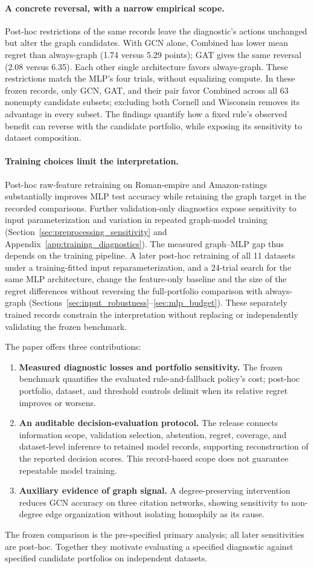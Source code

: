 \paragraph{A concrete reversal, with a narrow empirical scope.}
Post-hoc restrictions of the same records leave the diagnostic's actions unchanged but alter the graph candidates. With GCN alone, Combined has lower mean regret than always-graph (1.74 versus 5.29 points); GAT gives the same reversal (2.08 versus 6.35). Each other single architecture favors always-graph. These restrictions match the MLP's four trials, without equalizing compute. In these frozen records, only GCN, GAT, and their pair favor Combined across all 63 nonempty candidate subsets; excluding both Cornell and Wisconsin removes its advantage in every subset. The findings quantify how a fixed rule's observed benefit can reverse with the candidate portfolio, while exposing its sensitivity to dataset composition.

\paragraph{Training choices limit the interpretation.}
Post-hoc raw-feature retraining on Roman-empire and Amazon-ratings substantially improves MLP test accuracy while retaining the graph target in the recorded comparisons. Further validation-only diagnostics expose sensitivity to input parameterization and variation in repeated graph-model training (Section~\ref{sec:preprocessing_sensitivity} and Appendix~\ref{app:training_diagnostics}). The measured graph--MLP gap thus depends on the training pipeline. A later post-hoc retraining of all 11 datasets under a training-fitted input reparameterization, and a 24-trial search for the same MLP architecture, change the feature-only baseline and the size of the regret differences without reversing the full-portfolio comparison with always-graph (Sections~\ref{sec:input_robustness}--\ref{sec:mlp_budget}). These separately trained records constrain the interpretation without replacing or independently validating the frozen benchmark.

The paper offers three contributions:
\begin{enumerate}
    \item \textbf{Measured diagnostic losses and portfolio sensitivity.} The frozen benchmark quantifies the evaluated rule-and-fallback policy's cost; post-hoc portfolio, dataset, and threshold controls delimit when its relative regret improves or worsens.
    \item \textbf{An auditable decision-evaluation protocol.} The release connects information scope, validation selection, abstention, regret, coverage, and dataset-level inference to retained model records, supporting reconstruction of the reported decision scores. This record-based scope does not guarantee repeatable model training.
    \item \textbf{Auxiliary evidence of graph signal.} A degree-preserving intervention reduces GCN accuracy on three citation networks, showing sensitivity to non-degree edge organization without isolating homophily as its cause.
\end{enumerate}

The frozen comparison is the pre-specified primary analysis; all later sensitivities are post-hoc. Together they motivate evaluating a specified diagnostic against specified candidate portfolios on independent datasets.

